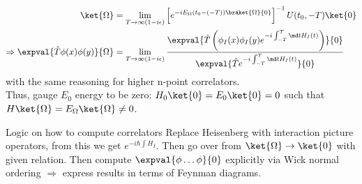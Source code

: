 \begin{align}
	\ket{\Omega} &= \lim_{T\rightarrow\infty(1-i\epsilon)} \left[e^{-i E_{\Omega} (t_0 - (-T)) \braket{\Omega}{0}}\right]^{-1} U(t_0,-T) \ket{0} \\
	\Rightarrow \expval{\hat{T}\phi(x) \phi(y)}{\Omega} &= \lim_{T\rightarrow \infty(1-i \epsilon)} \frac{\expval{\hat{T} \left(\phi_I(x) \phi_I(y) e^{-i \int_{-T}^{T} \md t H_I(t)} \right)}{0}}{\expval{\hat{T} e^{-i \int_{-T}^{T} \md t H_I(t)}}{0}}
\end{align}
with the same reasoning for higher n-point correlators.\\
Thus, gauge $E_0$ energy to be zero: $H_0 \ket{0}=E_0 \ket{0}=0$ such that $H\ket{\Omega} =E_{\Omega} \ket{\Omega} \neq 0$.
\begin{mybox}{Logic on how to compute correlators}
	Replace Heisenberg with interaction picture operators, from this we get $e^{-i \hbar \int H_I}$. Then go over from $\ket{\Omega}\rightarrow\ket{0}$ with given relation. Then compute $\expval{\phi \dots \phi}{0}$ explicitly via Wick normal ordering $\Rightarrow$ express results in terms of Feynman diagrams.
\end{mybox}



